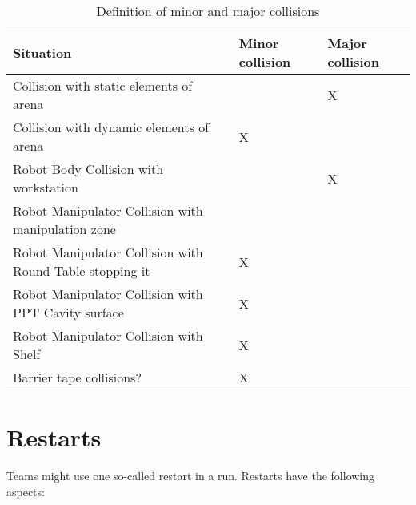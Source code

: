 \begin{table}[h!]
	\caption{Definition of minor and major collisions}
	\label{tab:collisions}
	\centering
  \begin{tabular}{|l|p{1.5cm}|p{1.5cm}|}
		\hline
		Situation                                                & Minor collision & Major collision \\ \hline
    Collision with static elements of arena                  &                 & X               \\
    Collision with dynamic elements of arena                 & X               &                 \\
    Robot Body Collision with workstation                    &                 & X               \\
    Robot Manipulator Collision with manipulation zone       &                 &                 \\
    Robot Manipulator Collision with Round Table stopping it & X               &                 \\
    Robot Manipulator Collision with PPT Cavity surface      & X               &                 \\
    Robot Manipulator Collision with Shelf                   & X               &                 \\
		Barrier tape collisions?                                 & X               &                 \\
    \hline
	\end{tabular}
\end{table}

\section{Restarts}
Teams might use one so-called restart in a run. Restarts have the following aspects:

